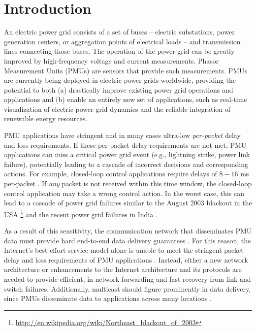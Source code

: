 \section{Introduction}
\label{sec:intro}


An electric power grid consists of a set of buses  -- electric substations, power generation centers, or aggregation points of electrical loads -- and transmission lines connecting those buses.
The operation of the power grid can be greatly improved by high-frequency voltage and current measurements. Phasor Measurement Units (PMUs) are  
sensors that provide such measurements. PMUs are currently being deployed in electric power grids worldwide, providing the potential to both 
(a) drastically improve existing power grid operations and applications and (b) enable an entirely new set of applications,
such as real-time visualization of electric power grid dynamics and the reliable integration of renewable energy resources. 

PMU applications have stringent and in many cases ultra-low \emph{per-packet} delay and loss requirements.  
If these per-packet delay requirements are not met, PMU applications can miss a critical power grid event (e.g., lightning strike, power link failure), potentially leading to a 
cascade of incorrect decisions and corresponding actions. For example, closed-loop control applications require delays of $8-16$ ms per-packet \cite{Bakken11}. 
If \emph{any} packet is not received within this time window, the closed-loop control application may take a wrong control action.
In the worst case, this can lead to a cascade of power grid failures similar to the August 2003 blackout in the USA 
\footnote{\url{http://en.wikipedia.org/wiki/Northeast_blackout_of_2003}} and the recent power grid failures in India \cite{IndiaBlackout}. 


As a result of this sensitivity, the communication network that disseminates PMU data must provide hard end-to-end data delivery guarantees \cite{Bakken11}. 
For this reason, the Internet's best-effort service model alone is unable to meet the stringent packet delay and loss requirements of PMU applications \cite{Birman05}. 
Instead, either a new network architecture or enhancements to the Internet architecture and its protocols are needed \cite{Bakken11,Birman05,Naspi10,Hopkinson09} to provide efficient, 
in-network forwarding and fast recovery from link and switch failures. Additionally, multicast should figure prominently in data  delivery, since PMUs disseminate data to applications 
across many locations \cite{Bakken11}.

